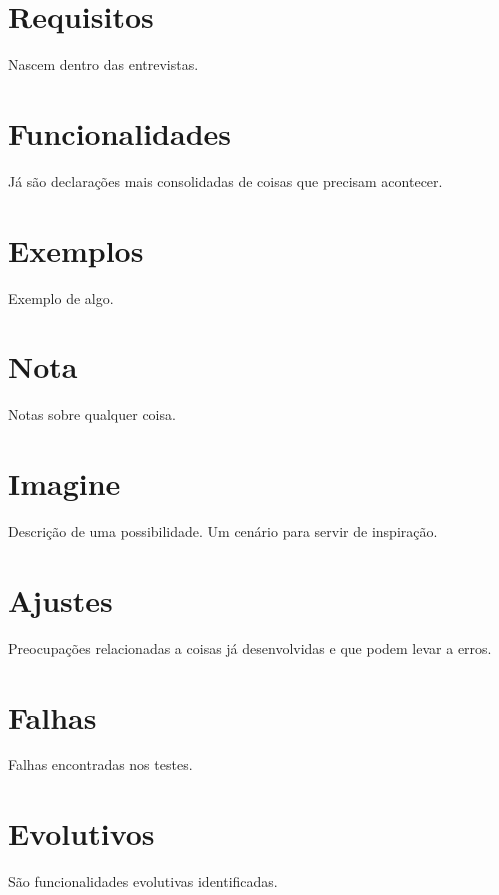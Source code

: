 \section{Requisitos}

Nascem dentro das entrevistas.

\listarAmbiente[TargetRequisito]{\ListaRequisito}

\section{Funcionalidades}

Já são declarações mais consolidadas de coisas que precisam acontecer.

\listarAmbiente[TargetFuncionalidade]{\ListaFuncionalidade}

\section{Exemplos}

Exemplo de algo.

\listarAmbiente[TargetExemplo]{\ListaExemplo}

\section{Nota}

Notas sobre qualquer coisa.

\listarAmbiente[TargetNota]{\ListaNota}

\section{Imagine}

Descrição de uma possibilidade. Um cenário para servir de inspiração.

\listarAmbiente[TargetImagine]{\ListaImagine}


\section{Ajustes}

Preocupações relacionadas a coisas já desenvolvidas e que podem levar a erros. 

\listarAmbiente[TargetAjuste]{\ListaAjuste}


\section{Falhas}

Falhas encontradas nos testes.

\listarAmbiente[TargetFalha]{\ListaFalha}

\section{Evolutivos}

São funcionalidades evolutivas identificadas.

\listarAmbiente[TargetEvolutivo]{\ListaEvolutivo}





